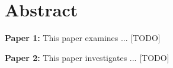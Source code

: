 \chapter*{Abstract}


\textbf{Paper 1:} This paper examines ... [TODO]

\vspace{1em}

\textbf{Paper 2:} This paper investigates ... [TODO]
